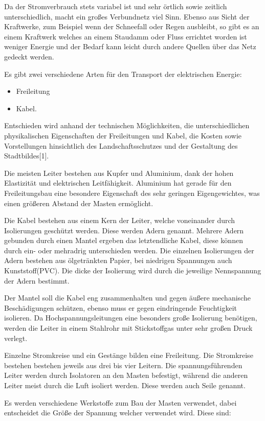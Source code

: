 Da der Stromverbrauch stets variabel ist und sehr örtlich sowie zeitlich unterschiedlich, macht ein großes Verbundnetz viel Sinn. Ebenso aus Sicht der Kraftwerke, zum Beispiel wenn der Schneefall oder Regen ausbleibt, so gibt es an einem Kraftwerk welches an einem Staudamm oder Fluss errichtet worden ist weniger Energie und der Bedarf kann leicht durch andere Quellen über das Netz gedeckt werden.\newline

Es gibt zwei verschiedene Arten für den Transport der elektrischen Energie:
\begin{itemize}
	\item Freileitung
	\item Kabel.
\end{itemize} 
Entschieden wird anhand der technischen Möglichkeiten, die unterschiedlichen physikalischen Eigenschaften der Freileitungen und Kabel, die Kosten sowie Vorstellungen hinsichtlich des Landschaftsschutzes und der Gestaltung des Stadtbildes[1].

Die meisten Leiter bestehen aus Kupfer und Aluminium, dank der hohen Elastizität und elektrischen Leitfähigkeit. Aluminium hat gerade für den Freileitungsbau eine besondere Eigenschaft des sehr geringen Eigengewichtes, was einen größeren Abstand der Masten ermöglicht.

Die Kabel bestehen aus einem Kern der Leiter, welche voneinander durch Isolierungen geschützt werden. Diese werden Adern genannt. Mehrere Adern gebunden durch einen Mantel ergeben das letztendliche Kabel, diese können durch ein- oder mehradrig unterschieden werden. Die einzelnen Isolierungen der Adern bestehen aus ölgetränkten Papier, bei niedrigen Spannungen auch Kunststoff(PVC). Die dicke der Isolierung wird durch die jeweilige Nennspannung der Adern bestimmt.

Der Mantel soll die Kabel eng zusammenhalten und gegen äußere mechanische Beschädigungen schützen, ebenso muss er gegen eindringende Feuchtigkeit isolieren. Da Hochspannungsleitungen eine besonders große Isolierung benötigen, werden die Leiter in einem Stahlrohr mit Stickstoffgas unter sehr großen Druck verlegt.

Einzelne Stromkreise und ein Gestänge bilden eine Freileitung. Die Stromkreise bestehen bestehen jeweils aus drei bis vier Leitern. Die spannungsführenden Leiter werden durch Isolatoren an den Masten befestigt, während die anderen Leiter meist durch die Luft isoliert werden. Diese werden auch Seile genannt. 

Es werden verschiedene Werkstoffe zum Bau der Masten verwendet, dabei entscheidet die Größe der Spannung welcher verwendet wird. Diese sind:


